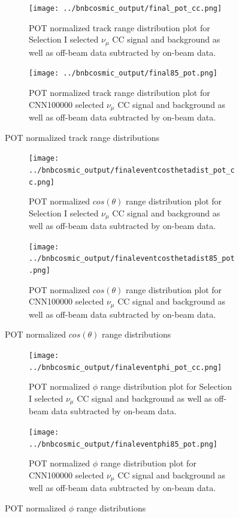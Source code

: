 \begin{figure}[htp!]
\centering
	\begin{subfigure}[t]{.475\textwidth}
		\texttt{[image: ../bnbcosmic\_output/final\_pot\_cc.png]}
		\caption{POT normalized track range distribution plot for Selection I selected $\nu_{\mu}$ CC signal and background as well as off-beam data subtracted by on-beam data.} 
		\label{fig:ccpottrack}
	\end{subfigure}
	\begin{subfigure}[t]{.475\textwidth}
	\centering
		\texttt{[image: ../bnbcosmic\_output/final85\_pot.png]}
		\caption{POT normalized track range distribution plot for CNN100000 selected $\nu_{\mu}$ CC signal and background as well as off-beam data subtracted by on-beam data.} 
	\label{fig:cnnpottrack}
	\end{subfigure}
\caption{POT normalized track range distributions}
\label{fig:pottrack}
\end{figure}

\begin{figure}[htp!]
\centering
	\begin{subfigure}[t]{.475\textwidth}
		\texttt{[image: ../bnbcosmic\_output/finaleventcosthetadist\_pot\_cc.png]}
		\caption{POT normalized $cos(\theta)$ range distribution plot for Selection I selected $\nu_{\mu}$ CC signal and background as well as off-beam data subtracted by on-beam data.} 
		\label{fig:ccpotcostheta}
	\end{subfigure}
	\begin{subfigure}[t]{.475\textwidth}
	\centering
		\texttt{[image: ../bnbcosmic\_output/finaleventcosthetadist85\_pot.png]}
		\caption{POT normalized $cos(\theta)$ range distribution plot for CNN100000 selected $\nu_{\mu}$ CC signal and background as well as off-beam data subtracted by on-beam data.} 
	\label{fig:cnnpotcostheta}
	\end{subfigure}
\caption{POT normalized $cos(\theta)$ range distributions}
\label{fig:potcostheta}
\end{figure}

\begin{figure}[htp!]
\centering
	\begin{subfigure}[t]{.475\textwidth}
		\texttt{[image: ../bnbcosmic\_output/finaleventphi\_pot\_cc.png]}
		\caption{POT normalized $\phi$ range distribution plot for Selection I selected $\nu_{\mu}$ CC signal and background as well as off-beam data subtracted by on-beam data.} 
		\label{fig:ccpotphi}
	\end{subfigure}
	\begin{subfigure}[t]{.475\textwidth}
	\centering
		\texttt{[image: ../bnbcosmic\_output/finaleventphi85\_pot.png]}
		\caption{POT normalized $\phi$ range distribution plot for CNN100000 selected $\nu_{\mu}$ CC signal and background as well as off-beam data subtracted by on-beam data.} 
	\label{fig:cnnpotphi}
	\end{subfigure}
\caption{POT normalized $\phi$ range distributions}
\label{fig:potphi}
\end{figure}

